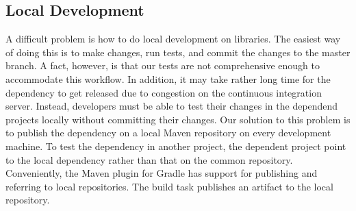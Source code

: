 \subsection{Local Development}
A difficult problem is how to do local development on libraries. The easiest way of doing this is to make changes, run tests, and commit the changes to the master branch. A fact, however, is that our tests are not comprehensive enough to accommodate this workflow. In addition, it may take rather long time for the dependency to get released due to congestion on the continuous integration server. Instead, developers must be able to test their changes in the dependend projects locally without committing their changes. Our solution to this problem is to publish the dependency on a local Maven repository on every development machine. To test the dependency in another project, the dependent project point to the local dependency rather than that on the common repository. Conveniently, the Maven plugin for Gradle has support for publishing and referring to local repositories. The build task  publishes an artifact to the local repository.



